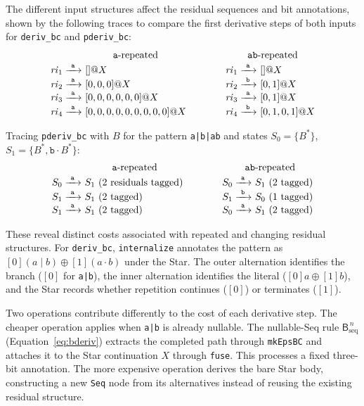 %
%
%

The different input structures affect
the residual sequences and bit annotations,
shown by the following traces to
compare the first derivative steps of both
inputs for \texttt{deriv\_bc} and
\texttt{pderiv\_bc}:
\[
\begin{array}{r@{\ }l@{\qquad\qquad}r@{\ }l}
\multicolumn{2}{c}{\texttt{a}\text{-repeated}} & \multicolumn{2}{c}{\texttt{ab}\text{-repeated}} \\[2pt]
\mathit{ri}_1 \xrightarrow{\ \mathtt{a}\ } & []@X & \mathit{ri}_1 \xrightarrow{\ \mathtt{a}\ } & []@X \\
\mathit{ri}_2 \xrightarrow{\ \mathtt{a}\ } & [0,0,0]@X & \mathit{ri}_2 \xrightarrow{\ \mathtt{b}\ } & [0,1]@X \\
\mathit{ri}_3 \xrightarrow{\ \mathtt{a}\ } & [0,0,0,0,0,0]@X & \mathit{ri}_3 \xrightarrow{\ \mathtt{a}\ } & [0,1]@X \\
\mathit{ri}_4 \xrightarrow{\ \mathtt{a}\ } & [0,0,0,0,0,0,0,0,0]@X & \mathit{ri}_4 \xrightarrow{\ \mathtt{b}\ } & [0,1,0,1]@X
\end{array}
\]

Tracing \texttt{pderiv\_bc} with $B$ for the
pattern \texttt{a|b|ab} and states $S_0 = \{B^{*}\}$,
$S_1 = \{B^{*}, \mathtt{b}\cdot B^{*}\}$:
\[
\begin{array}{r@{\ }l@{\qquad\qquad}r@{\ }l}
\multicolumn{2}{c}{\texttt{a}\text{-repeated}} & \multicolumn{2}{c}{\texttt{ab}\text{-repeated}} \\[2pt]
S_0 \xrightarrow{\ \mathtt{a}\ } & S_1\ (\text{2 residuals tagged}) & S_0 \xrightarrow{\ \mathtt{a}\ } & S_1\ (\text{2 tagged}) \\
S_1 \xrightarrow{\ \mathtt{a}\ } & S_1\ (\text{2 tagged}) & S_1 \xrightarrow{\ \mathtt{b}\ } & S_0\ (\text{1 tagged}) \\
S_1 \xrightarrow{\ \mathtt{a}\ } & S_1\ (\text{2 tagged}) & S_0 \xrightarrow{\ \mathtt{a}\ } & S_1\ (\text{2 tagged})
\end{array}
\]

\clearpage
These reveal distinct costs
associated with repeated and changing residual structures.
For \texttt{deriv\_bc}, \texttt{internalize}
annotates the pattern as
$[0](a \mathbin{|} b) \oplus [1](a \cdot b)$
under the Star.
The outer alternation identifies the branch
($[0]$ for \texttt{a|b}), the inner alternation
identifies the literal ($[0]a \oplus [1]b$),
and the Star records whether repetition continues
($[0]$) or terminates ($[1]$).

Two operations contribute differently to
the cost of each derivative step.
The cheaper operation applies when
\texttt{a|b} is already nullable.
The nullable-Seq rule
$\mathsf{B}_{\mathrm{seq}}^{\,n}$
(Equation~\eqref{eq:bderiv})
extracts the completed path through
\texttt{mkEpsBC} and attaches it to
the Star continuation $X$ through \texttt{fuse}.
This processes a fixed three-bit annotation.
The more expensive operation derives the
bare Star body, constructing a new \texttt{Seq}
node from its alternatives instead of
reusing the existing residual structure.

